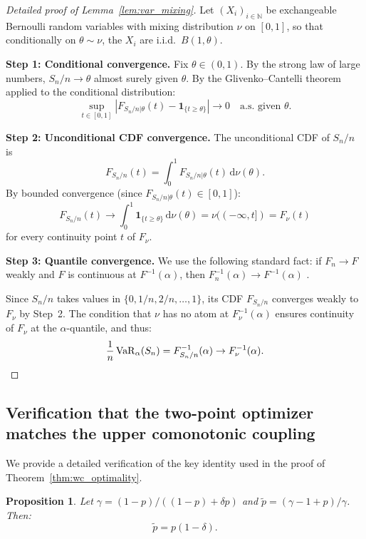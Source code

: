 \documentclass[11pt]{article}
\newtheorem{proposition}[theorem]{Proposition}
\theoremstyle{definition}
\newcommand{\dd}{\mathrm{d}}
\newcommand{\N}{\mathbb{N}}
\newcommand{\VaR}{\operatorname{VaR}}
\newcommand{\1}{\mathbf{1}}
\begin{document}
\begin{proof}[Detailed proof of Lemma~\ref{lem:var_mixing}]
Let $(X_i)_{i \in \N}$ be exchangeable Bernoulli random variables with mixing distribution $\nu$ on $[0,1]$, so that conditionally on $\theta \sim \nu$, the $X_i$ are i.i.d.\ $B(1,\theta)$.

\textbf{Step 1: Conditional convergence.} Fix $\theta \in (0,1)$. By the strong law of large numbers, $S_n/n \to \theta$ almost surely given $\theta$. By the Glivenko--Cantelli theorem applied to the conditional distribution:
\begin{equation}\label{eq:gc_cond}
  \sup_{t \in [0,1]} \left|F_{S_n/n|\theta}(t) - \1_{\{t \geq \theta\}}\right| \to 0 \quad\text{a.s.\ given } \theta.
\end{equation}

\textbf{Step 2: Unconditional CDF convergence.} The unconditional CDF of $S_n/n$ is
\[
  F_{S_n/n}(t) = \int_0^1 F_{S_n/n|\theta}(t) \,\dd\nu(\theta).
\]
By bounded convergence (since $F_{S_n/n|\theta}(t) \in [0,1]$):
\[
  F_{S_n/n}(t) \to \int_0^1 \1_{\{t \geq \theta\}} \,\dd\nu(\theta) = \nu((-\infty, t]) = F_\nu(t)
\]
for every continuity point $t$ of $F_\nu$.

\textbf{Step 3: Quantile convergence.} We use the following standard fact: if $F_n \to F$ weakly and $F$ is continuous at $F^{-1}(\alpha)$, then $F_n^{-1}(\alpha) \to F^{-1}(\alpha)$ \citep[Lemma~21.2]{vanderVaart1998}.

Since $S_n/n$ takes values in $\{0, 1/n, 2/n, \ldots, 1\}$, its CDF $F_{S_n/n}$ converges weakly to $F_\nu$ by Step~2. The condition that $\nu$ has no atom at $F_\nu^{-1}(\alpha)$ ensures continuity of $F_\nu$ at the $\alpha$-quantile, and thus:
\[
  \frac{1}{n}\VaR_\alpha(S_n) = F_{S_n/n}^{-1}(\alpha) \to F_\nu^{-1}(\alpha). \qedhere
\]
\end{proof}

\subsection{Verification that the two-point optimizer matches the upper comonotonic coupling}\label{app:match}

We provide a detailed verification of the key identity used in the proof of Theorem~\ref{thm:wc_optimality}.

\begin{proposition}\label{prop:match}
Let $\gamma = (1-p)/((1-p) + \delta p)$ and $\tilde{p} = (\gamma - 1 + p)/\gamma$. Then:
\begin{equation}\label{eq:ptilde_identity}
  \tilde{p} = p(1-\delta).
\end{equation}
\end{proposition}
\end{document}
